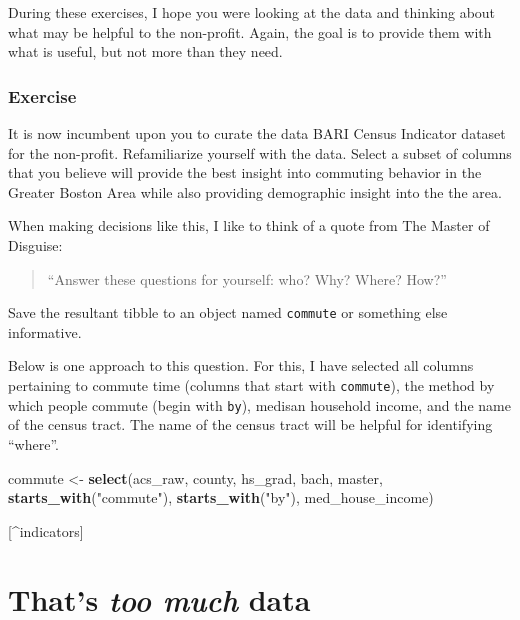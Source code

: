 \documentclass[
]{book}
\newenvironment{Shaded}{\begin{snugshade}}{\end{snugshade}}
\newcommand{\KeywordTok}[1]{\textcolor[rgb]{0.13,0.29,0.53}{\textbf{#1}}}
\newcommand{\NormalTok}[1]{#1}
\newcommand{\StringTok}[1]{\textcolor[rgb]{0.31,0.60,0.02}{#1}}
\begin{document}
During these exercises, I hope you were looking at the data and thinking about what may be helpful to the non-profit. Again, the goal is to provide them with what is useful, but not more than they need.

\hypertarget{exercise-1}{%
\subsection{Exercise}\label{exercise-1}}

It is now incumbent upon you to curate the data BARI Census Indicator dataset for the non-profit. Refamiliarize yourself with the data. Select a subset of columns that you believe will provide the best insight into commuting behavior in the Greater Boston Area while also providing demographic insight into the the area.

When making decisions like this, I like to think of a quote from The Master of Disguise:

\begin{quote}
``Answer these questions for yourself: who? Why? Where? How?''
\end{quote}

Save the resultant tibble to an object named \texttt{commute} or something else informative.

Below is one approach to this question. For this, I have selected all columns pertaining to commute time (columns that start with \texttt{commute}), the method by which people commute (begin with \texttt{by}), medisan household income, and the name of the census tract. The name of the census tract will be helpful for identifying ``where''.

\begin{Shaded}
\begin{Highlighting}[]
\NormalTok{commute \textless{}{-}}\StringTok{ }\KeywordTok{select}\NormalTok{(acs\_raw,}
\NormalTok{                  county,}
\NormalTok{                  hs\_grad, bach, master,}
                  \KeywordTok{starts\_with}\NormalTok{(}\StringTok{"commute"}\NormalTok{),}
                  \KeywordTok{starts\_with}\NormalTok{(}\StringTok{"by"}\NormalTok{),}
\NormalTok{                  med\_house\_income)}
\end{Highlighting}
\end{Shaded}

{[}\^{}indicators{]}

\hypertarget{thats-too-much-data}{%
\chapter{\texorpdfstring{That's \emph{too much} data}{That's too much data}}\label{thats-too-much-data}}
\end{document}
